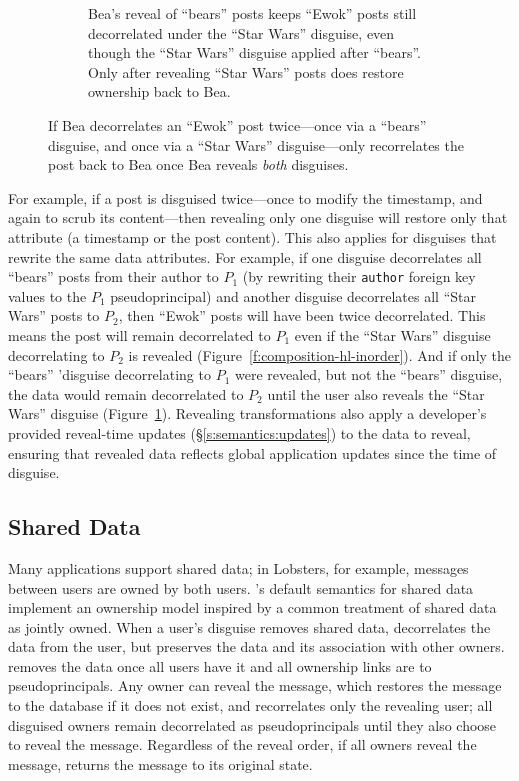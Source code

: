 \begin{figure}
\begin{subfigure}[t]{.47\columnwidth}
  \caption{Bea's reveal of ``bears'' posts keeps ``Ewok'' posts still
    decorrelated under the ``Star Wars''
    disguise, even though the ``Star Wars'' disguise applied after ``bears''. Only after revealing ``Star Wars'' posts does \sys restore ownership back to
    Bea.}
\label{f:composition-hl-ooo}
\end{subfigure}
    \caption[\sys only reveals the original state of data disguised multiple times once
    all disguises appied to the data have been revealed.]{
        If Bea decorrelates an ``Ewok'' post twice---once via a ``bears''
        disguise, and once via a ``Star Wars'' disguise---\sys only recorrelates
        the post back to Bea once Bea reveals \emph{both} disguises.}
\label{f:composition-hl}
\end{figure}

%
For example, if a post is disguised twice---once to modify the timestamp, and
again to scrub its content---then revealing only one disguise will restore only
that attribute (\eg a timestamp or the post content). 
%
This also applies for disguises that rewrite the same data attributes. For
example, if one disguise decorrelates all ``bears'' posts from their author to $P_1$
(\ie by rewriting their \texttt{author} foreign key values to the $P_1$
pseudoprincipal) and another disguise decorrelates all ``Star Wars'' posts to
$P_2$, then ``Ewok'' posts will have been twice decorrelated. 
%
This means the post will remain decorrelated to $P_1$ even if the
``Star Wars'' disguise decorrelating to $P_2$ is revealed
(Figure~\ref{f:composition-hl-inorder}).
%
And if only the ``bears'' 'disguise decorrelating to $P_1$ were revealed, but not
the ``bears'' disguise, the data would remain decorrelated to $P_2$ until the
user also reveals the ``Star Wars'' disguise (Figure~\ref{f:composition-hl-ooo}).
%
%
Revealing transformations also apply a developer's provided reveal-time updates
(\S\ref{s:semantics:updates}) to the data to reveal, ensuring that revealed data
reflects global application updates since the time of disguise.
%

\subsection{Shared Data}
Many applications support shared data; in Lobsters, for example, messages
between users are owned by both users.
%
\sys's default semantics for shared data implement an ownership model inspired
by a common treatment of shared data as jointly owned.
%
When a user's disguise removes shared data, \sys decorrelates the data from the
\xxing user, but preserves the data and its association with other owners.
%
\sys removes the data once all users have \xxed it and all ownership links are
to pseudoprincipals.
%
Any owner can reveal the message, which restores the message to the database if
it does not exist, and recorrelates only the revealing user; all disguised
owners remain decorrelated as pseudoprincipals until they also choose to reveal
the message.
%
Regardless of the reveal order, if all owners reveal the message, \sys returns
the message to its original state.
%

